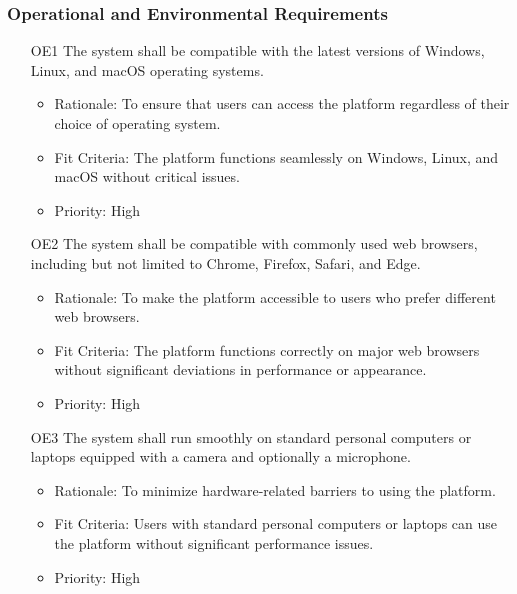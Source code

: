\documentclass[12pt]{article}
\begin{document}
\subsubsection{Operational and Environmental Requirements}
\begin{itemize}
    \item[OE1] The system shall be compatible with the latest versions of Windows, Linux, and macOS operating systems. \label{OE1}
    \begin{itemize}
        \item Rationale: To ensure that users can access the platform regardless of their choice of operating system.
        \item Fit Criteria: The platform functions seamlessly on Windows, Linux, and macOS without critical issues.
        \item Priority: High
    \end{itemize}
\end{itemize}
\begin{itemize}
    \item[OE2] The system shall be compatible with commonly used web browsers, including but not limited to Chrome, Firefox, Safari, and Edge. \label{OE2}
    \begin{itemize}
        \item Rationale: To make the platform accessible to users who prefer different web browsers.
        \item Fit Criteria: The platform functions correctly on major web browsers without significant deviations in performance or appearance.
        \item Priority: High
    \end{itemize}
\end{itemize}
\begin{itemize}
    \item[OE3] The system shall run smoothly on standard personal computers or laptops equipped with a camera and optionally a microphone. \label{OE3}
    \begin{itemize}
        \item Rationale: To minimize hardware-related barriers to using the platform.
        \item Fit Criteria: Users with standard personal computers or laptops can use the platform without significant performance issues.
        \item Priority: High
    \end{itemize}
\end{itemize}
\end{document}
